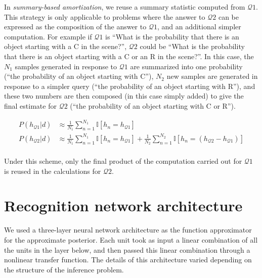 In \emph{summary-based amortization}, we reuse a summary statistic computed from $\mathcal{Q}1$. This strategy is only applicable to problems where the answer to $\mathcal{Q}2$ can be expressed as the composition of the answer to $\mathcal{Q}1$, and an additional simpler computation. For example if $\mathcal{Q}1$ is ``What is the probability that there is an object starting with a C in the scene?'', $\mathcal{Q}2$ could be ``What is the probability that there is an object starting with a C or an R in the scene?''. In this case, the $N_1$ samples generated in response to $\mathcal{Q}1$ are summarized into one probability (``the probability of an object starting with C''), $N_2$ new samples are generated in response to a simpler query (``the probability of an object starting with R''), and these two numbers are then composed (in this case simply added) to give the final estimate for $\mathcal{Q}2$ (``the probability of an object starting with C or R''). 


\begin{align*}
\textstyle
P(h_{\mathcal{Q}1}|d) & \approx \frac{1}{N_1}\sum_{n=1}^{N_1} \mathbb{I}[h_n=h_{\mathcal{Q}1}]\\
P(h_{\mathcal{Q}2}|d) & \approx \frac{1}{N_1}\sum_{n=1}^{N_1} \mathbb{I}[h_n=h_{\mathcal{Q}1}] + \frac{1}{N_2}\sum_{n=1}^{N_2} \mathbb{I}[h_n= (h_{\mathcal{Q}2} - h_{\mathcal{Q}1})]\\
\end{align*}


Under this scheme, only the final product of the computation carried out for $\mathcal{Q}1$ is reused in the calculations for $\mathcal{Q}2$.

\newpage

\section{Recognition network architecture}
\label{app:LTI_arch}

We used a three-layer neural network architecture as the function approximator for the approximate posterior. Each unit took as input a linear combination of all the units in the layer below, and then passed this linear combination through a nonlinear transfer function. The details of this architecture varied depending on the structure of the inference problem. 

